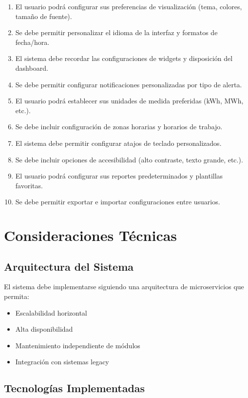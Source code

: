 \documentclass[12pt,a4paper]{article}
\begin{document}
\begin{enumerate}[label=RF12.\arabic*]
    \item El usuario podrá configurar sus preferencias de visualización (tema, colores, tamaño de fuente).
    \item Se debe permitir personalizar el idioma de la interfaz y formatos de fecha/hora.
    \item El sistema debe recordar las configuraciones de widgets y disposición del dashboard.
    \item Se debe permitir configurar notificaciones personalizadas por tipo de alerta.
    \item El usuario podrá establecer sus unidades de medida preferidas (kWh, MWh, etc.).
    \item Se debe incluir configuración de zonas horarias y horarios de trabajo.
    \item El sistema debe permitir configurar atajos de teclado personalizados.
    \item Se debe incluir opciones de accesibilidad (alto contraste, texto grande, etc.).
    \item El usuario podrá configurar sus reportes predeterminados y plantillas favoritas.
    \item Se debe permitir exportar e importar configuraciones entre usuarios.
\end{enumerate}

\section{Consideraciones Técnicas}

\subsection{Arquitectura del Sistema}

El sistema debe implementarse siguiendo una arquitectura de microservicios que permita:

\begin{itemize}
    \item Escalabilidad horizontal
    \item Alta disponibilidad
    \item Mantenimiento independiente de módulos
    \item Integración con sistemas legacy
\end{itemize}

\subsection{Tecnologías Implementadas}
\end{document}
